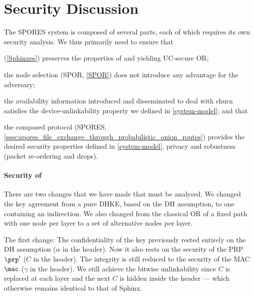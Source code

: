 \section{Security Discussion}%
\label{security-discussion}



The \ac{SPORES} system is composed of several parts, each of which requires its 
own security analysis.
We thus primarily need to ensure that
\begin{enumerate*}
\item \Sphinxes (\cref{Sphinxes}) preserves the properties of 
  \textcite{CLOnionRouting} and \textcite{Sphinx} yielding \ac{UC}-secure 
  \ac{OR};
\item the node selection (\ac{SPOR}, \cref{SPOR}) does not introduce any 
  advantage for the adversary;
\item the availability information introduced and disseminated to deal with 
  churn satisfies the device-unlinkability property we defined in 
  \cref{system-model}; and that
\item the composed protocol (\ac{SPORES}, \cref{ssec:spores_file_exchange_through_probabilistic_onion_routes}) provides the desired 
  security properties defined in \cref{system-model}, \ie
  privacy and robustness (packet re-ordering and drops).
\end{enumerate*}

\paragraph*{Security of \Sphinxes}

There are two changes that we have made that must be analysed.
We changed the key agreement from a pure \ac{DHKE}, \ie based on the \ac{DH} 
assumption, to one containing an indirection.
We also changed from the classical \ac{OR} of a fixed path with one node per 
layer to a set of alternative nodes per layer.

The first change:
The confidentiality of the key previously rested entirely on the \ac{DH} 
assumption (\(\alpha\) in the header).
Now it also rests on the security of the \ac{PRP} \(\prp'\) (\(C\) in the 
header).
The integrity is still reduced to the security of the \ac{MAC} \(\mac\) 
(\(\gamma\) in the header).
We still achieve the bitwise unlinkability since \(C\) is replaced at each 
layer and the next \(C\) is hidden inside the header --- which otherwise 
remains identical to that of \ac{Sphinx}.

